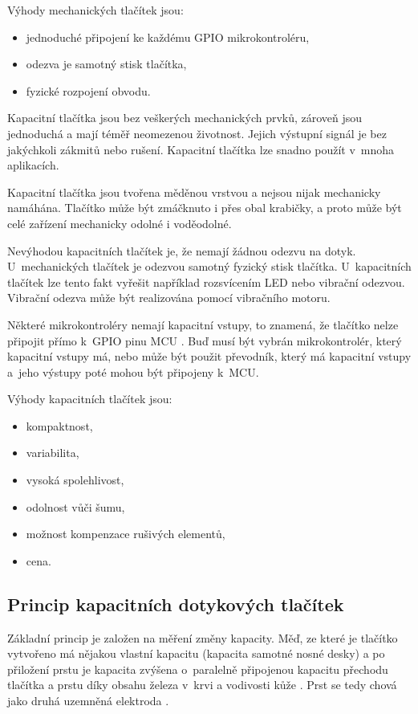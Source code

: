 Výhody mechanických tlačítek jsou:
\begin{itemize}
  \item jednoduché připojení ke každému GPIO mikrokontroléru,
  \item odezva je samotný stisk tlačítka,
  \item fyzické rozpojení obvodu.
\end{itemize}

Kapacitní tlačítka jsou bez veškerých mechanických prvků, zároveň jsou jednoduchá a mají téměř neomezenou 
životnost. Jejich výstupní signál je bez jakýchkoli zákmitů nebo rušení. Kapacitní tlačítka lze snadno použít v~mnoha aplikacích. 

Kapacitní tlačítka jsou tvořena měděnou vrstvou a nejsou nijak mechanicky namáhána. Tlačítko může být zmáčknuto i přes 
obal krabičky, a proto může být celé zařízení mechanicky odolné i voděodolné. 

Nevýhodou kapacitních tlačítek je, že nemají žádnou odezvu na dotyk. U~mechanických tlačítek je odezvou samotný fyzický 
stisk tlačítka. U~kapacitních tlačítek lze tento fakt vyřešit například rozsvícením LED nebo vibrační odezvou. Vibrační 
odezva může být realizována pomocí vibračního motoru. 

Některé mikrokontroléry nemají kapacitní vstupy, to znamená, že tlačítko nelze připojit přímo k~GPIO pinu MCU \cite{ESP_C3_dtsh}. 
Buď musí být vybrán mikrokontrolér, který kapacitní vstupy má, nebo může být použit převodník, který má kapacitní vstupy a~jeho 
výstupy poté mohou být připojeny k~MCU. 

Výhody kapacitních tlačítek jsou:
\begin{itemize}
  \item kompaktnost,
  \item variabilita,
  \item vysoká spolehlivost,
  \item odolnost vůči šumu,
  \item možnost kompenzace rušivých elementů,
  \item cena. 
\end{itemize}

\subsection{Princip kapacitních dotykových tlačítek}
Základní princip je založen na měření změny kapacity. Měď, ze které je tlačítko vytvořeno má
nějakou vlastní kapacitu (kapacita samotné nosné desky) a po přiložení prstu je kapacita zvýšena o~paralelně 
připojenou kapacitu přechodu tlačítka a prstu díky obsahu železa v~krvi a vodivosti kůže \cite{PrincipKapTl}. 
Prst se tedy chová jako druhá uzemněná elektroda \cite{PrincipKapTl}. 

